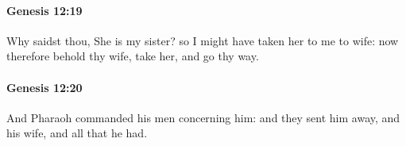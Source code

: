 		\paragraph{Genesis 12:19} %
			\label{GENESIS-12-19}

			Why saidst thou, She is my sister? so I might have taken her to me to wife: now therefore behold thy wife, take her, and go thy way.


		\paragraph{Genesis 12:20} %
			\label{GENESIS-12-20}

			And Pharaoh commanded his men concerning him: and they sent him away, and his wife, and all that he had.

